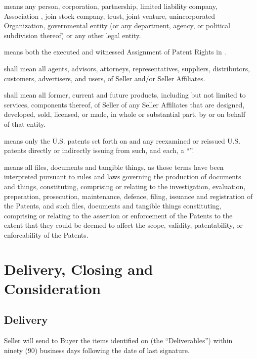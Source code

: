 \documentclass[letterpaper,10pt,openany,oneside,english]{sphinxmanual}
\begin{document}
 means any person, corporation, partnership, limited liability company, Association , join stock company, trust, joint venture, unincorporated Organization, governmental entity (or any department, agency, or political subdivision thereof) or any other legal entity.

 means both the executed and witnessed Assignment of Patent Rights in .

 shall mean all agents, advisors, attorneys, representatives, suppliers, distributors, customers, advertisers, and users, of Seller and/or Seller Affiliates.

 shall mean all former, current and future products, including but not limited to services, components thereof, of Seller of any Seller Affiliates that are designed, developed, sold, licensed, or made, in whole or substantial part, by or on behalf of that entity.

 means only the U.S. patents set forth on  and any reexamined or reissued U.S. patents directly or indirectly issuing from such, and each, a “”.

 means all files, documents and tangible things, as those terms have been interpreted pursuant to rules and laws governing the production of documents and things, constituting, comprising or relating to the investigation, evaluation, preperation, prosecution, maintenance, defence, filing, issuance and registration of the Patents, and such files, documents and tangible things constituting, comprising or relating to the assertion or enforcement of the Patents to the extent that they could be deemed to affect the scope, validity, patentability, or enforcability of the Patents.


\section{Delivery, Closing and Consideration}
\label{\detokenize{2-delivery:delivery-closing-and-consideration}}\label{\detokenize{2-delivery::doc}}

\subsection{Delivery}
\label{\detokenize{2-delivery:delivery}}
Seller will send to Buyer the items identified on  (the “Deliverables”) within ninety (90) business days following the date of last signature.
\end{document}
